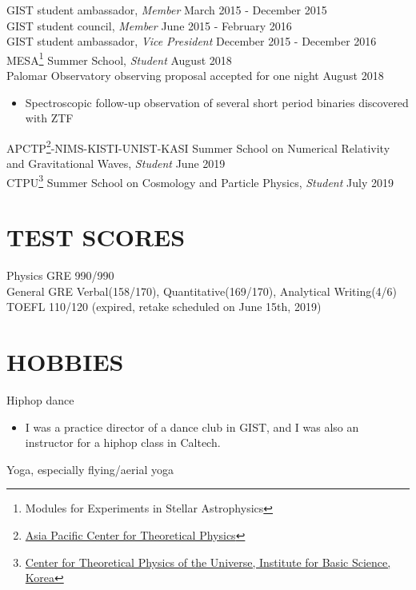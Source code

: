 \documentclass[margin, 10pt]{res} %
\begin{document}
\begin{resume}
GIST student ambassador, {\sl Member} \hfill March 2015 - December 2015\\
GIST student council, {\sl Member} \hfill June 2015 - February 2016\\
GIST student ambassador, {\sl Vice President} \hfill December 2015 - December 2016 \\
MESA\footnote{Modules for Experiments in Stellar Astrophysics} Summer School, {\sl Student} \hfill August 2018 \\
Palomar Observatory observing proposal accepted for one night \hfill August 2018
\begin{itemize}
\item[] Spectroscopic follow-up observation of several short period binaries discovered with ZTF
\end{itemize}
APCTP\footnote{\href{https://www.apctp.org/main/}{Asia Pacific Center for Theoretical Physics}}-NIMS-KISTI-UNIST-KASI Summer School on Numerical Relativity and Gravitational Waves, {\sl Student} \hfill June 2019 \\
CTPU\footnote{\href{https://ctpu.ibs.re.kr/html/ctpu_en/}{Center for Theoretical Physics of the Universe, Institute for Basic Science, Korea}}  Summer School on Cosmology and Particle Physics, {\sl Student} \hfill July 2019 \\



\section{TEST SCORES} 

Physics GRE 990/990 \\
General GRE Verbal(158/170), Quantitative(169/170), Analytical Writing(4/6) \\
TOEFL 110/120 (expired, retake scheduled on June 15th, 2019)\\


\section{HOBBIES} 

Hiphop dance
\begin{itemize}
\item[] I was a practice director of a dance club in GIST, and I was also an instructor for a hiphop class in Caltech.
\end{itemize}
Yoga, especially flying/aerial yoga


\end{resume}
\end{document}
